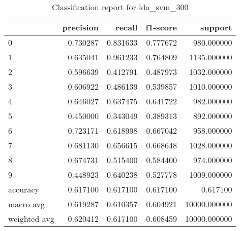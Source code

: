 \begin{table}[htb!]
\centering
\caption{Classification report for lda_svm_300}
\label{tab:classification-report-lda_svm_300}
\begin{tabular}{lrrrr}
\toprule
 & precision & recall & f1-score & support \\
\midrule
0 & 0.730287 & 0.831633 & 0.777672 & 980.000000 \\
1 & 0.635041 & 0.961233 & 0.764809 & 1135.000000 \\
2 & 0.596639 & 0.412791 & 0.487973 & 1032.000000 \\
3 & 0.606922 & 0.486139 & 0.539857 & 1010.000000 \\
4 & 0.646027 & 0.637475 & 0.641722 & 982.000000 \\
5 & 0.450000 & 0.343049 & 0.389313 & 892.000000 \\
6 & 0.723171 & 0.618998 & 0.667042 & 958.000000 \\
7 & 0.681130 & 0.656615 & 0.668648 & 1028.000000 \\
8 & 0.674731 & 0.515400 & 0.584400 & 974.000000 \\
9 & 0.448923 & 0.640238 & 0.527778 & 1009.000000 \\
accuracy & 0.617100 & 0.617100 & 0.617100 & 0.617100 \\
macro avg & 0.619287 & 0.610357 & 0.604921 & 10000.000000 \\
weighted avg & 0.620412 & 0.617100 & 0.608459 & 10000.000000 \\
\bottomrule
\end{tabular}
\end{table}
